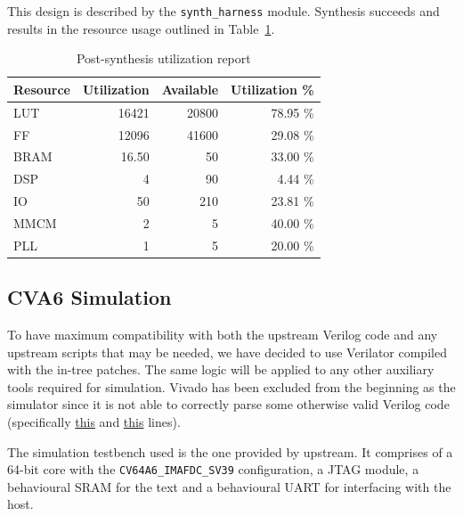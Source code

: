 \documentclass[a4paper,11pt]{article}
\begin{document}
This design is described by the \texttt{synth\_harness} module. Synthesis
succeeds and results in the resource usage outlined in Table~\ref{synth-util}.

\begin{table}[H]
  \centering
  \begin{tabular}{lrrr}
    \toprule
    Resource & Utilization & Available & Utilization \% \\\midrule
    LUT      & 16421       & 20800     & 78.95 \% \\
    FF       & 12096       & 41600     & 29.08 \% \\
    BRAM     & 16.50       & 50        & 33.00 \% \\
    DSP      & 4           & 90        &  4.44 \% \\
    IO       & 50          & 210       & 23.81 \% \\
    MMCM     & 2           & 5         & 40.00 \% \\
    PLL      & 1           & 5         & 20.00 \% \\
    \bottomrule
  \end{tabular}
  \caption{Post-synthesis utilization report}%
  \label{synth-util}
\end{table}

\subsection{CVA6 Simulation}

To have maximum compatibility with both the upstream Verilog code and any
upstream scripts that may be needed, we have decided to use Verilator compiled
with the in-tree patches. The same logic will be applied to any other auxiliary
tools required for simulation. Vivado has been excluded from the beginning as
the simulator since it is not able to correctly parse some otherwise valid
Verilog code (specifically
\href{https://github.com/openhwgroup/cva6/blob/db088159ebca1480b3c5f083f5ac4268ea6749b6/vendor/pulp-platform/common_cells/include/common_cells/registers.svh#L47}{this}
and
\href{https://github.com/openhwgroup/cva6/blob/db088159ebca1480b3c5f083f5ac4268ea6749b6/vendor/pulp-platform/common_cells/include/common_cells/registers.svh#L125}{this}
lines).

The simulation testbench used is the one provided by upstream. It comprises of a
64-bit core with the \texttt{CV64A6\_IMAFDC\_SV39} configuration, a JTAG module,
a behavioural SRAM for the text and a behavioural UART for interfacing with the
host.
\end{document}
